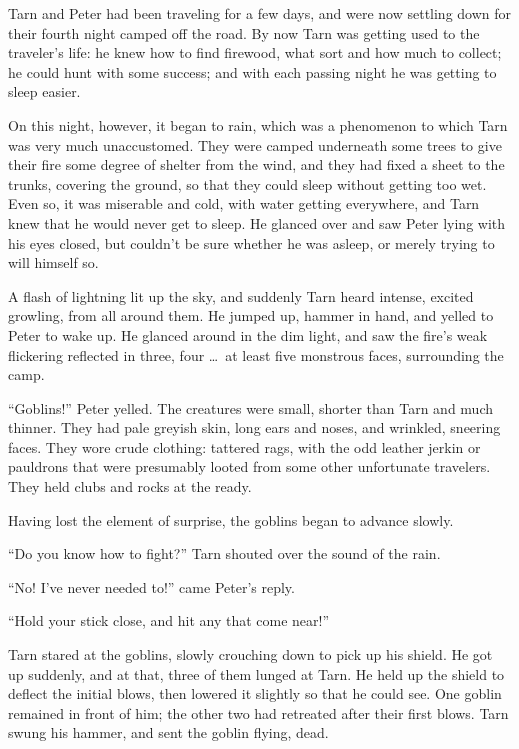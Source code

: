 \divider
Tarn and Peter had been traveling for a few days, and were now settling down for their fourth night camped off the road.  By now Tarn was getting used to the traveler's life: he knew how to find firewood, what sort and how much to collect; he could hunt with some success; and with each passing night he was getting to sleep easier.

On this night, however, it began to rain, which was a phenomenon to which Tarn was very much unaccustomed.  They were camped underneath some trees to give their fire some degree of shelter from the wind, and they had fixed a sheet to the trunks, covering the ground, so that they could sleep without getting too wet.  Even so, it was miserable and cold, with water getting everywhere, and Tarn knew that he would never get to sleep.  He glanced over and saw Peter lying with his eyes closed, but couldn't be sure whether he was asleep, or merely trying to will himself so.

A flash of lightning lit up the sky, and suddenly Tarn heard intense, excited growling, from all around them.  He jumped up, hammer in hand, and yelled to Peter to wake up.  He glanced around in the dim light, and saw the fire's weak flickering reflected in three, four \ldots\  at least five monstrous faces, surrounding the camp.

``Goblins!'' Peter yelled.  The creatures were small, shorter than Tarn and much thinner.  They had pale greyish skin, long ears and noses, and wrinkled, sneering faces.  They wore crude clothing: tattered rags, with the odd leather jerkin or pauldrons that were presumably looted from some other unfortunate travelers.  They held clubs and rocks at the ready.

Having lost the element of surprise, the goblins began to advance slowly.

``Do you know how to fight?'' Tarn shouted over the sound of the rain.

``No!  I've never needed to!'' came Peter's reply.

``Hold your stick close, and hit any that come near!''

Tarn stared at the goblins, slowly crouching down to pick up his shield.  He got up suddenly, and at that, three of them lunged at Tarn.  He held up the shield to deflect the initial blows, then lowered it slightly so that he could see.  One goblin remained in front of him; the other two had retreated after their first blows.  Tarn swung his hammer, and sent the goblin flying, dead.

